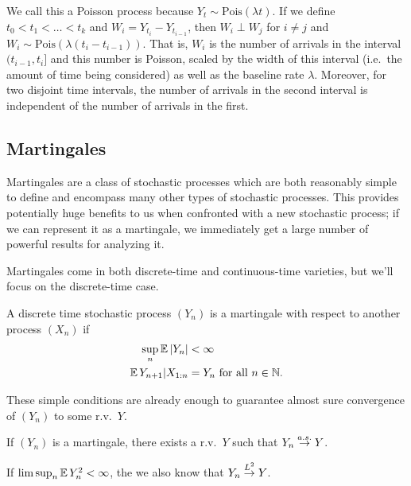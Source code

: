 We call this a Poisson process because $Y_t \sim \text{Pois}(\lambda t)$.
If we define $t_0 < t_1 < \hdots < t_k$ and $W_i = Y_{t_i} - Y_{t_{i-1}}$,
then $W_i \perp W_j$ for $i \neq j$ and 
$W_i \sim \text{Pois}(\lambda(t_i - t_{i-1}))$.
That is, $W_i$ is the number of arrivals in the interval $(t_{i-1}, t_i]$ 
and this number is Poisson, scaled by the width of this interval (i.e.\ the 
amount of time being considered) as well as the baseline rate $\lambda$.
Moreover, for two disjoint time intervals, the number of 
arrivals in the second interval is independent of the number of arrivals in the first.

\subsection{Martingales}

Martingales are a class of stochastic processes which 
are both reasonably simple to define and encompass 
many other types of stochastic processes. 
This provides potentially huge benefits to us
when confronted with a new stochastic process; if 
we can represent it as a martingale, we immediately 
get a large number of powerful results for analyzing it.

Martingales come in both discrete-time and continuous-time
varieties, but we'll focus on the discrete-time case.

\begin{definition}[Martingale]
    A discrete time stochastic process 
    $(Y_n)$ is a martingale with respect to another 
    process $(X_n)$
    if
    \begin{align*}
        \sup_{n} \operatorname*{\mathbb{E}} |Y_n| &< \infty \\
        \operatorname*{\mathbb{E}} Y_{n+1} | X_{1:n} &= Y_n \text{ for all } n \in \mathbb N.
    \end{align*}
\end{definition}

These simple conditions are already enough to guarantee 
almost sure convergence of $(Y_n)$ to some r.v.\ $Y$.

\begin{theorem}
    If $(Y_n)$ is a martingale, there exists a r.v.\ 
    $Y$ such that $Y_n \overset{a.s.}{\rightarrow} Y$.

    If $\limsup_n \operatorname*{\mathbb{E}} Y_n^2 < \infty$, the we also know that 
    $Y_n \overset{L^{2}}{\rightarrow} Y$.
\end{theorem}

